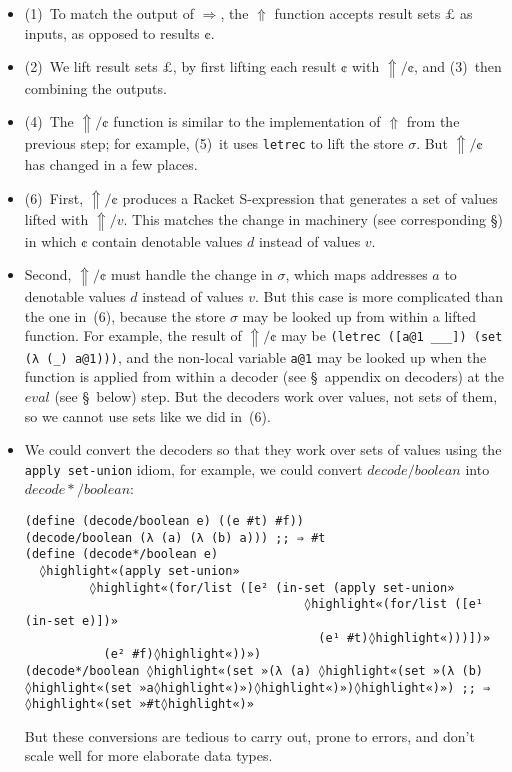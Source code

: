 \documentclass[12pt, oneside]{book}
\begin{document}
\begin{itemize}
  \item (1)~To match the output of \(⇒\), the \(⇑\) function accepts result sets \(£\) as inputs, as opposed to results \(¢\).
  \item (2)~We lift result sets \(£\), by first lifting each result \(¢\) with \(⇑/¢\), and (3)~then combining the outputs.
  \item (4)~The \(⇑/¢\) function is similar to the implementation of \(⇑\) from the previous step; for example, (5)~it uses \texttt{letrec} to lift the store \(σ\). But \(⇑/¢\) has changed in a few places.
  \item (6)~First, \(⇑/¢\) produces a Racket S-expression that generates a set of values lifted with \(⇑/v\). This matches the change in machinery (see corresponding §) in which \(¢\) contain denotable values \(d\) instead of values \(v\).
  \item Second, \(⇑/¢\) must handle the change in \(σ\), which maps addresses \(a\) to denotable values \(d\) instead of values \(v\). But this case is more complicated than the one in~(6), because the store \(σ\) may be looked up from within a lifted function. For example, the result of \(⇑/¢\) may be \texttt{(letrec ([a@1 \_\_\_]) (set (λ (\_) a@1)))}, and the non-local variable \texttt{a@1} may be looked up when the function is applied from within a decoder (see §~appendix on decoders) at the \(eval\) (see §~below) step. But the decoders work over values, not sets of them, so we cannot use sets like we did in~(6).
  \item We could convert the decoders so that they work over sets of values using the \texttt{apply set-union} idiom, for example, we could convert \(decode/boolean\) into \(decode*/boolean\):
        \begin{Verbatim}
(define (decode/boolean e) ((e #t) #f))
(decode/boolean (λ (a) (λ (b) a))) ;; ⇒ #t
(define (decode*/boolean e)
  ◊highlight«(apply set-union»
         ◊highlight«(for/list ([e² (in-set (apply set-union»
                                       ◊highlight«(for/list ([e¹ (in-set e)])»
                                         (e¹ #t)◊highlight«)))])»
           (e² #f)◊highlight«))»)
(decode*/boolean ◊highlight«(set »(λ (a) ◊highlight«(set »(λ (b) ◊highlight«(set »a◊highlight«)»)◊highlight«)»)◊highlight«)») ;; ⇒ ◊highlight«(set »#t◊highlight«)»
        \end{Verbatim}
        But these conversions are tedious to carry out, prone to errors, and don’t scale well for more elaborate data types.

\end{itemize}
\end{document}
